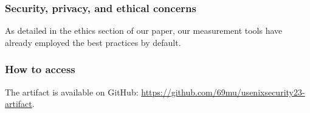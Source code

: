 
\subsubsection{Security, privacy, and ethical concerns}
As detailed in the ethics section of our paper,
our measurement tools have already employed the best practices by default.
\subsubsection{How to access}

The artifact is available on GitHub:
\url{https://github.com/69mu/usenixsecurity23-artifact}.


